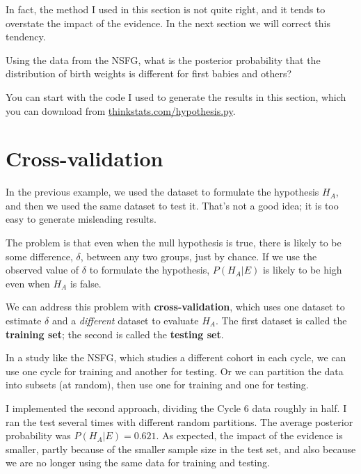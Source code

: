 \documentclass[12pt]{book}
\begin{document}
In fact, the method I used in this section is not quite right, and
it tends to overstate the impact of the evidence.  In the next section
we will correct this tendency.

\begin{ex}

Using the data from the NSFG, what is the posterior probability that
the distribution of birth weights is different for first babies and
others?

You can start with the code I used to generate the results in this
section, which you can download from \url{thinkstats.com/hypothesis.py}.

\end{ex}


\section{Cross-validation}

In the previous example, we used the dataset to formulate the
hypothesis $H_A$, and then we used the same dataset to test it.
That's not a good idea; it is too easy to generate misleading results.

The problem is that even when the null hypothesis is true, there is
likely to be some difference, $\delta$, between any two groups, just
by chance.  If we use the observed value of $\delta$ to formulate
the hypothesis, $P(H_A | E)$ is likely to be high even when $H_A$ is
false.

We can address this problem with {\bf cross-validation}, which uses
one dataset to estimate $\delta$ and a {\em different} dataset to
evaluate $H_A$.  The first dataset is called the {\bf training set};
the second is called the {\bf testing set}.

In a study like the NSFG, which studies a different cohort in each
cycle, we can use one cycle for training and another for testing.
Or we can partition the data into subsets (at random), then use
one for training and one for testing.

I implemented the second approach, dividing the Cycle 6 data roughly
in half.  I ran the test several times with different random partitions.
The average posterior probability was $P(H_A | E) = 0.621$.  As
expected, the impact of the evidence is smaller, partly because of
the smaller sample size in the test set, and also because we are
no longer using the same data for training and testing.

\end{document}
